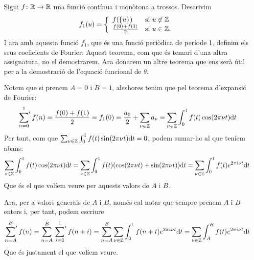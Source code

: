 Sigui $f\colon \mathbb R\to \mathbb R$ una funció contínua i monòtona a trossos. Descrivim
\[
    f_1(u)=\left\{\begin{array}{ll}
        f(\{u\}) & \text{si } u\not \in \mathbb Z\\
        \frac{f(0)+f(1)}{2}& \text{si } u\in \mathbb Z.
    \end{array}\right.
\]
I ara amb aquesta funció $f_1$, que és una funció periòdica de període 1, definim els seus coeficients de Fourier:
Aquest teorema, com que és temari d'una altra assignatura, no el demostrarem. Ara donarem un altre teorema que ens serà útil per a la demostració de l'equació funcional de $\theta$.
\begin{pf}
    Notem que si prenem $A=0$ i $B=1$, aleshores tenim que pel teorema d'expansió de Fourier:
    \[
    \sideset{}{'}\sum_{n=0}^1 f(n)=\frac{f(0)+f(1)}{2}=f_1(0)=\frac{a_0}{2}+\sum_{\nu\in\mathbb Z}a_\nu=\sum_{\nu\in\mathbb Z}\int_0^1 f(t)\cos(2\pi \nu t)\mathrm{d} t
    \]
    Per tant, com que $\sum_{\nu\in\mathbb Z}\int_0^1f(t)\sin(2\pi \nu t)\mathrm{d} t=0$, podem sumar-ho al que teníem abans:
    \[
    \sum_{\nu\in\mathbb Z}\int_0^1 f(t)\cos(2\pi \nu t)\mathrm{d} t=
    \sum_{\nu\in\mathbb Z}\int_0^1 f(t)(\cos(2\pi \nu t)+\sin(2\pi \nu t))\mathrm{d} t=
    \sum_{\nu\in\mathbb Z}\int_0^1 f(t)e^{2\pi i\nu t}\mathrm{d} t
    \]
    Que és el que volíem veure per aquests valors de $A$ i $B$.\par

    Ara, per a valors generals de $A$ i $B$, només cal notar que sempre prenem $A$ i $B$ enters i, per tant, podem escriure
    \[
    \sideset{}{'}\sum_{n=A}^{B}f(n)=\sum_{n=A}^B\sideset{}{'}\sum_{i=0}^1 f(n+i)=
    \sum_{n=A}^{B}\sum_{\nu\in \mathbb Z}\int_0^1 f(n+t)e^{2\pi i \nu t}\mathrm{d} t=
    \sum_{\nu\in\mathbb Z}\int_A^B f(t)e^{2\pi i \nu t}\mathrm{d} t
    \]
    Que és justament el que volíem veure.
\end{pf}
